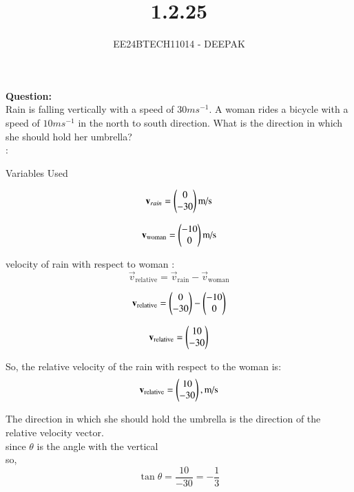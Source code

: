\documentclass[journal]{IEEEtran}
\begin{document}

\vspace{3cm}

\title{1.2.25}
\author{EE24BTECH11014 - DEEPAK
}
{\let\newpage\relax\maketitle}

\renewcommand{\thefigure}{\theenumi}
\renewcommand{\thetable}{\theenumi}
\setlength{\intextsep}{10pt} %


\renewcommand{\thetable}{\theenumi}




\textbf{Question: }\\

Rain is falling vertically with a speed of $ 30 ms^{-1}$. A woman rides a bicycle with a speed of $10 ms^{-1}$ in the north to south direction. What is the direction in which she should hold her umbrella?
\\
\solution :
\begin{table}[h!]    
  \centering
  
  \caption{Variables Used}
  \label{tab1.1.9.2}
\end{table}



\[
\mathbf{v}_{rain} = \begin{pmatrix}0\\-30\end{pmatrix} \text{m/s}
\]


\[
\mathbf{v}_{\text{woman}} = \begin{pmatrix}-10\\0\end{pmatrix} \text{m/s}
\]

velocity of rain with respect to woman :
\[
\vec{v}_{\text{relative}} = \vec{v}_{\text{rain}} - \vec{v}_{\text{woman}}
\]

\[
\mathbf{v}_{\text{relative}} = \begin{pmatrix}0\\-30\end{pmatrix} - \begin{pmatrix}-10\\0\end{pmatrix}
\]

\[
\mathbf{v}_{\text{relative}} = \begin{pmatrix}10\\-30\end{pmatrix}
\]

So, the relative velocity of the rain with respect to the woman is:
\[
\mathbf{v}_{\text{relative}} = \begin{pmatrix}10\\-30\end{pmatrix}, \text{m/s}
\]


The direction in which she should hold the umbrella is the direction of the relative velocity vector. \\
since $\theta$ is the angle with the vertical \\so,
\[
\tan \theta =  \frac{10}{-30} = -\frac{1}{3}
\]
\end{document}

